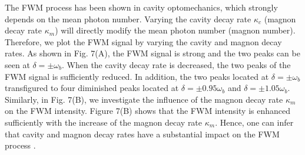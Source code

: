 \documentclass[aps,pra,superscriptaddress,balancelastpage,twocolumn]{revtex4}
\begin{document}
The FWM process has been shown in cavity optomechanics, which strongly
depends on the mean photon number. Varying the cavity decay rate $\kappa_{c}$
(magnon decay rate $\kappa_{m}$) will directly modify the mean photon number
(magnon number). Therefore, we plot the FWM signal by varying the cavity and
magnon decay rates. As shown in Fig. 7(A), the FWM signal is strong and the
two peaks can be seen at $\delta=\pm\omega_{b}$. When the cavity decay rate
is decreased, the two peaks of the FWM signal is sufficiently reduced. In
addition, the two peaks located at $\delta=\pm\omega_{b}$ transfigured to
four diminished peaks located at $\delta=\pm0.95\omega_{b}$ and $%
\delta=\pm1.05\omega_{b}$. Similarly, in Fig. 7(B), we investigate the
influence of the magnon decay rate $\kappa_{m}$ on the FWM intensity. Figure
7(B) shows that the FWM intensity is enhanced sufficiently with the increase
of the magnon decay rate $\kappa_{m}$. Hence, one can infer that cavity and
magnon decay rates have a substantial impact on the FWM process \cite{FWM7}.
\end{document}
